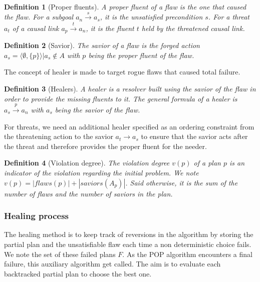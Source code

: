 \documentclass[]{article}
\newtheorem{definition}{Definition}
\begin{document}
\begin{definition}[Proper fluents]

A proper fluent of a flaw is the one that caused the flaw. For a subgoal
\(a_n \xrightarrow{s} a_s\), it is the unsatisfied precondition \(s\).
For a threat \(a_t\) of a causal link \(a_p \xrightarrow{t} a_n\), it is
the fluent \(t\) held by the threatened causal link.

\end{definition}

\begin{definition}[Savior]

The savior of a flaw is the forged action
\(a_s = \langle \emptyset, \{p\} \rangle | a_s \notin A\) with \(p\)
being the proper fluent of the flaw.

\end{definition}

The concept of healer is made to target rogue flaws that caused total
failure.

\begin{definition}[Healers]

A healer is a resolver built using the savior of the flaw in order to
provide the missing fluents to it. The general formula of a healer is
\(a_s \xrightarrow{p} a_n\) with \(a_s\) being the savior of the flaw.

\end{definition}

For threats, we need an additional healer specified as an ordering
constraint from the threatening action to the savior \(a_t \to a_s\) to
ensure that the savior acts after the threat and therefore provides the
proper fluent for the needer.

\begin{definition}[Violation degree]

The violation degree \(v(p)\) of a plan \(p\) is an indicator of the
violation regarding the initial problem. We note
\(v(p) = |flaws(p)| + |saviors(A_p)|\). Said otherwise, it is the sum of
the number of flaws and the number of saviors in the plan.

\end{definition}

\subsubsection{Healing process}\label{healing-process}

The healing method is to keep track of reversions in the algorithm by
storing the partial plan and the unsatisfiable flaw each time a non
deterministic choice fails. We note the set of these failed plans \(F\).
As the POP algorithm encounters a final failure, this auxiliary
algorithm get called. The aim is to evaluate each backtracked partial
plan to choose the best one.
\end{document}
